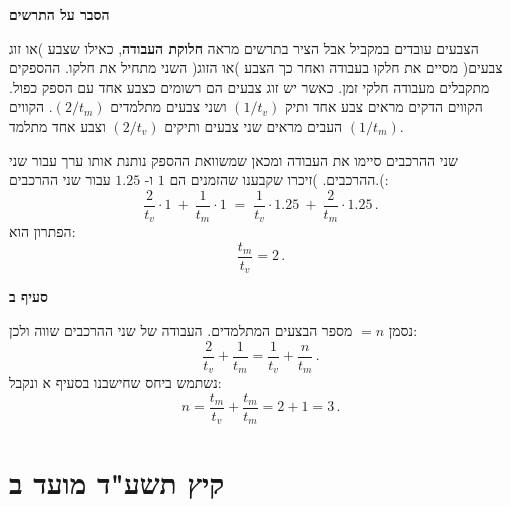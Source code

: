 \smallskip

\noindent\textbf{הסבר על התרשים}

הצבעים עובדים במקביל אבל הציר בתרשים מראה
\textbf{חלוקת העבודה},
כאילו שצבע )או זוג צבעים( מסיים את חלקו בעבודה ואחר כך הצבע )או הזוג( השני מתחיל את חלקו. ההספקים מתקבלים מעבודה חלקי זמן. כאשר יש זוג צבעים הם רשומים כצבע אחד עם הספק כפול. הקווים הדקים מראים צבע אחד ותיק 
$(1/t_v)$
ושני צבעים מתלמדים
$(2/t_m)$.
הקווים העבים מראים שני צבעים ותיקים
$(2/t_v)$
וצבע אחד מתלמד
$(1/t_m)$.

\np

שני ההרכבים סיימו את העבודה ומכאן שמשוואת ההספק נותנת אותו ערך עבור שני ההרכבים. )זיכרו שקבענו שהזמנים הם 
$1$
ו-%
$1.25$
עבור שני ההרכבים.(:
\[
\frac{2}{t_v}\cdot 1 \:+\: \frac{1}{t_m}\cdot 1 \;=\; \frac{1}{t_v}\cdot 1.25 \:+\: \frac{2}{t_m} \cdot 1.25 \,.
\]
הפתרון הוא:
\[
\frac{t_m}{t_v}=2\,.
\]

\textbf{סעיף ב}

\begin{center}
\end{center}

נסמן
$=n$
מספר הבצעים המתלמדים. העבודה של שני ההרכבים שווה ולכן:
\[
\frac{2}{t_v} + \frac{1}{t_m} = \frac{1}{t_v} + \frac{n}{t_m}\,.
\]
נשתמש ביחס שחישבנו בסעיף א ונקבל:
\[
n = \frac{t_m}{t_v} + \frac{t_m}{t_m} = 2+1=3\,.
\]


\np

\section{קיץ תשע"ד מועד ב}

